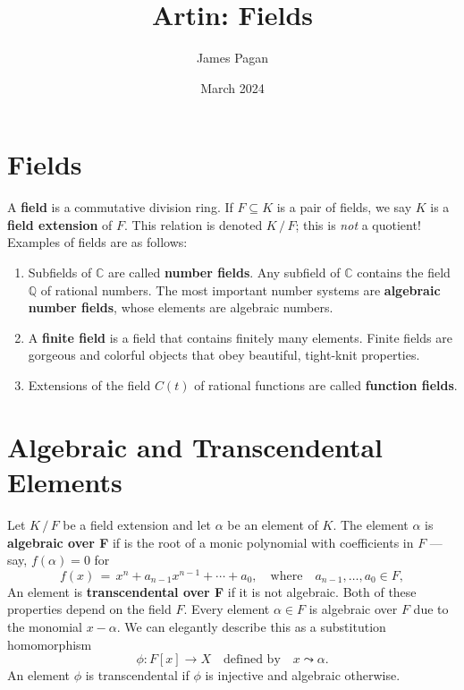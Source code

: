 \documentclass[11pt]{article}
\title{Artin: Fields}
\author{James Pagan}
\date{March 2024}
\begin{document}
\maketitle
\tableofcontents
\newpage


\section{Fields}

A \textbf{field} is a commutative division ring. If $F \subseteq K$ is a pair of fields, we say $K$ is a \textbf{field extension} of $F$. This relation is denoted $K \, / \, F$; this is \textit{not} a quotient! Examples of fields are as follows:
\begin{enumerate}
  \item Subfields of $\mathbb{C}$ are called \textbf{number fields}. Any subfield of $\mathbb{C}$ contains the field $\mathbb{Q}$ of rational numbers. The most important number systems are \textbf{algebraic number fields}, whose elements are algebraic numbers.
  \item A \textbf{finite field} is a field that contains finitely many elements. Finite fields are gorgeous and colorful objects that obey beautiful, tight-knit properties.
  \item Extensions of the field $C(t)$ of rational functions are called \textbf{function fields}.
\end{enumerate}


\section{Algebraic and Transcendental Elements}

Let $K \, / \, F$ be a field extension and let $\alpha$ be an element of $K$. The element $\alpha$ is \textbf{algebraic over F} if is the root of a monic polynomial with coefficients in $F$ --- say, $f(\alpha) = 0$ for
\[
  f(x) \, = \, x^{n} + a_{n - 1}x^{n - 1} + \cdots + a_{0}, \quad \text{where} \quad a_{n - 1}, \ldots, a_{0} \in F,
\]
An element is \textbf{transcendental over F} if it is not algebraic. Both of these properties depend on the field $F$. Every element $\alpha \in F$ is algebraic over $F$ due to the monomial $x - \alpha$. We can elegantly describe this as a substitution homomorphism
\[
  \phi : F[x] \to X \quad \text{defined by} \quad x \leadsto \alpha.
\]
An element $\phi$ is transcendental if $\phi$ is injective and algebraic otherwise.
\end{document}
